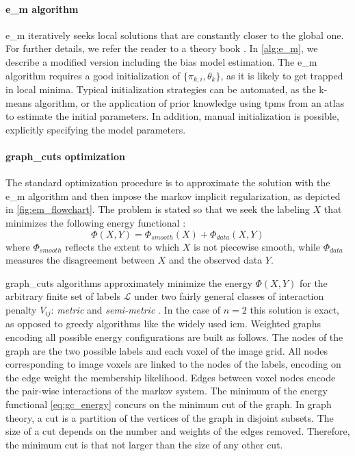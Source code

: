\paragraph{\Acrlong*{e_m} algorithm}
\label{sec:em}
\Gls*{e_m} iteratively seeks local solutions that are
  constantly closer to the global one.
For further details, we refer the reader to a theory book
  \citep{bishop_pattern_2009}.
In \autoref{alg:e_m}, we describe a modified version including
  the bias model estimation.
The \gls*{e_m} algorithm requires a good initialization of
  $\lbrace \pi_{k,i}, \theta_k \rbrace$, as it is
  likely to get trapped in local minima.
Typical initialization strategies can be automated, as the k-means algorithm,
  or the application of prior knowledge using \glspl*{tpm} from an atlas
  to estimate the initial parameters.
In addition, manual initialization is possible, explicitly specifying the
  model parameters.


\paragraph{\Acrlong*{graph_cuts} optimization}
\label{sec:background_graph_cuts}
The standard optimization procedure is to approximate the solution
  with the \gls*{e_m} algorithm and then impose the \gls*{markov}
  implicit regularization, as depicted in \autoref{fig:em_flowchart}.
The problem is stated so that we seek the labeling $X$ 
  that minimizes the following energy functional \citep{boykov_fast_2001}:
\begin{equation}
\Phi(X,Y)=\Phi_{smooth}(X)+\Phi_{data}(X,Y)
\label{eq:gc_energy}
\end{equation}
where $\Phi_{smooth}$ reflects the extent to which $X$ is not
  piecewise smooth, while $\Phi_{data}$ measures the 
  disagreement between $X$ and the observed data $Y$.

\Gls*{graph_cuts} algorithms approximately minimize the energy $\Phi(X,Y)$
  for the arbitrary finite set of labels $\mathcal{L}$ under two fairly
  general classes of interaction penalty $V_{ij}$:
  \emph{metric} and \emph{semi-metric} \citep{boykov_fast_2001}.
In the case of $n=2$ this solution is exact, as opposed to greedy algorithms
  like the widely used \gls*{icm}.
Weighted graphs encoding all possible energy configurations
  are built as follows.
The nodes of the graph are the two possible labels and each voxel of
  the image grid.
All nodes corresponding to image voxels are linked to the nodes
  of the labels, encoding on the edge weight the membership likelihood.
Edges between voxel nodes encode the pair-wise interactions of the
  \gls*{markov} system.
The minimum of the energy functional \eqref{eq:gc_energy} concurs on 
  the minimum cut of the graph.
In graph theory, a cut is a partition of the vertices of the graph
  in disjoint subsets.
The size of a cut depends on the number and weights of the edges
  removed.
Therefore, the minimum cut is that not larger than the size of any
  other cut.
  

